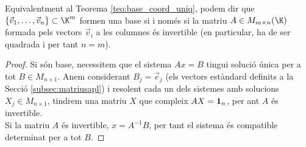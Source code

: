 \begin{observacio}
    Equivalentment al Teorema \ref{teo:base_coord_uniq}, podem dir que $\{\vec v_1, \dots, \vec v_n\} \subset \K^m$ formen una base si i només si la matriu $A\in M_{m\times n}(\K)$ formada pels vectors $\vec v_i$ a les columnes és invertible (en particular, ha de ser quadrada i per tant $n=m$).
\end{observacio}
\begin{proof}
    Si són base, necessitem que el sistema $Ax=B$ tingui solució única per a tot $B\in M_{n\times 1}$. Anem considerant $B_j=\vec e_j$ (els vectors estàndard definits a la Secció \ref{subsec:matriusapl}) i resolent cada un dels sistemes amb solucions $X_j\in M_{n\times 1}$, tindrem una matriu $X$ que compleix $AX=\mathbf{1}_n$, per ant $A$ és invertible.\\
    Si la matriu $A$ és invertible, $x=A^{-1}B$, per tant el sistema és compatible determinat per a tot $B$.
\end{proof}

